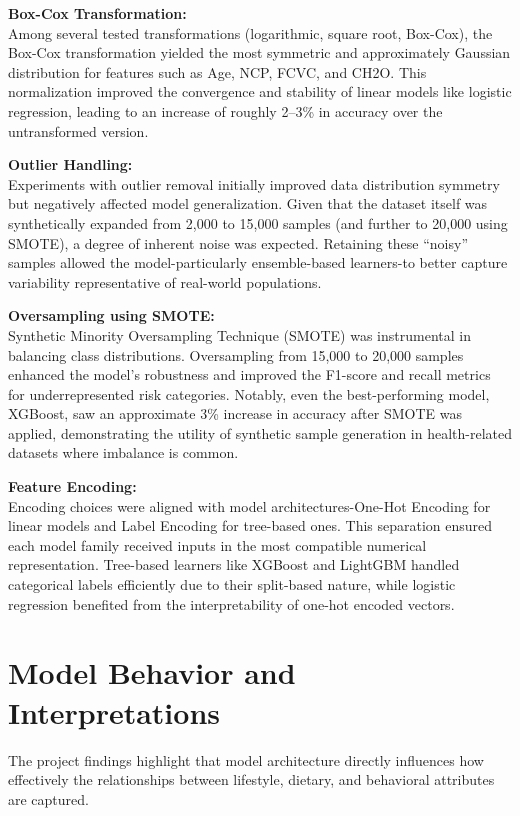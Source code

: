 \textbf{Box-Cox Transformation:}\\
Among several tested transformations (logarithmic, square root, Box-Cox), the Box-Cox transformation yielded the most symmetric and approximately Gaussian distribution for features such as Age, NCP, FCVC, and CH2O.
This normalization improved the convergence and stability of linear models like logistic regression, leading to an increase of roughly 2–3\% in accuracy over the untransformed version.

\textbf{Outlier Handling:}\\
Experiments with outlier removal initially improved data distribution symmetry but negatively affected model generalization.
Given that the dataset itself was synthetically expanded from 2,000 to 15,000 samples (and further to 20,000 using SMOTE), a degree of inherent noise was expected.
Retaining these “noisy” samples allowed the model-particularly ensemble-based learners-to better capture variability representative of real-world populations.

\textbf{Oversampling using SMOTE:}\\
Synthetic Minority Oversampling Technique (SMOTE) was instrumental in balancing class distributions.
Oversampling from 15,000 to 20,000 samples enhanced the model’s robustness and improved the F1-score and recall metrics for underrepresented risk categories.
Notably, even the best-performing model, XGBoost, saw an approximate 3\% increase in accuracy after SMOTE was applied, demonstrating the utility of synthetic sample generation in health-related datasets where imbalance is common.

\textbf{Feature Encoding:}\\
Encoding choices were aligned with model architectures-One-Hot Encoding for linear models and Label Encoding for tree-based ones.
This separation ensured each model family received inputs in the most compatible numerical representation.
Tree-based learners like XGBoost and LightGBM handled categorical labels efficiently due to their split-based nature, while logistic regression benefited from the interpretability of one-hot encoded vectors.


\section{Model Behavior and Interpretations}\label{sec:model-behavior-and-interpretations}

The project findings highlight that model architecture directly influences how effectively the relationships between lifestyle, dietary, and behavioral attributes are captured.

